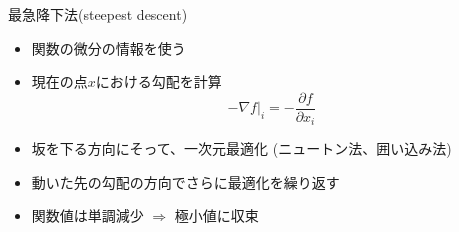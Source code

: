 \begin{frame}[t,fragile]{最急降下法(steepest descent)}
  \begin{itemize}
  \item 関数の微分の情報を使う
  \item 現在の点$x$における勾配を計算
    \[
    -\nabla f|_i = -\frac{\partial f}{\partial x_i}
    \]
  \item 坂を下る方向にそって、一次元最適化 (ニュートン法、囲い込み法)
  \item 動いた先の勾配の方向でさらに最適化を繰り返す
  \item 関数値は単調減少 $\Rightarrow$ 極小値に収束
  \end{itemize}
\end{frame}
